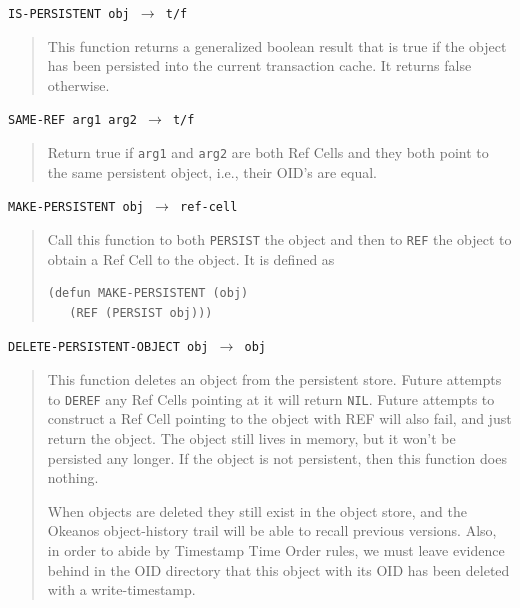 \documentclass[article,oneside]{memoir}
\begin{document}
\noindent \texttt{IS-PERSISTENT obj $\rightarrow$ t/f}

\begin{quote}
This function returns a generalized boolean result that is true if the object has been persisted into the current transaction cache. It returns false otherwise.
\end{quote}

\noindent \texttt{SAME-REF arg1 arg2 $\rightarrow$ t/f}

\begin{quote}
Return true if \texttt{arg1} and \texttt{arg2} are both Ref Cells and they both point to the same persistent object, i.e., their OID's are equal.
\end{quote}

\noindent \texttt{MAKE-PERSISTENT obj $\rightarrow$ ref-cell}

\begin{quote}
Call this function to both \texttt{PERSIST} the object and then to \texttt{REF} the object to obtain a Ref Cell to the object. It is defined as 
\begin{verbatim}
(defun MAKE-PERSISTENT (obj)  
   (REF (PERSIST obj)))
\end{verbatim}
\end{quote}

\noindent \texttt{DELETE-PERSISTENT-OBJECT obj $\rightarrow$ obj}

\begin{quote}
This function deletes an object from the persistent store. Future attempts to \texttt{DEREF} any Ref Cells pointing at it will return \texttt{NIL}. Future attempts to construct a Ref Cell pointing to the object with REF will also fail, and just return the object. The object still lives in memory, but it won't be persisted any longer. If the object is not persistent, then this function does nothing.

When objects are deleted they still exist in the object store, and the Okeanos object-history trail will be able to recall previous versions. Also, in order to abide by Timestamp Time Order rules, we must leave evidence behind in the OID directory that this object with its OID has been deleted with a write-timestamp.
\end{quote}
\end{document}
